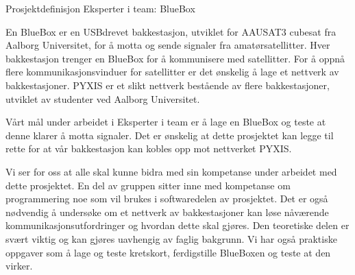 Prosjektdefinisjon Eksperter i team: BlueBox

En BlueBox er en USBdrevet bakkestasjon, utviklet for AAUSAT3 cubesat fra Aalborg Universitet, for å motta og sende signaler fra amatørsatellitter. Hver bakkestasjon trenger en BlueBox for å kommunisere med satellitter.  For å oppnå flere kommunikasjonsvinduer for satellitter er det ønskelig å lage et nettverk av bakkestasjoner. PYXIS er et slikt nettverk bestående av flere bakkestasjoner, utviklet av studenter ved Aalborg Universitet.
  
Vårt mål under arbeidet i Eksperter i team er å lage en BlueBox og teste at denne klarer å motta signaler. Det er ønskelig at dette prosjektet kan legge til rette for at vår bakkestasjon kan kobles opp mot nettverket PYXIS. 

Vi ser for oss at alle skal kunne bidra med sin kompetanse under arbeidet med dette prosjektet.  En del av gruppen sitter inne med kompetanse om programmering noe som vil brukes i softwaredelen av prosjektet.  Det er også nødvendig å undersøke om et nettverk av bakkestasjoner kan løse nåværende kommunikasjonsutfordringer og hvordan dette skal gjøres. Den teoretiske delen er svært viktig og kan gjøres uavhengig av faglig bakgrunn. Vi har også praktiske oppgaver som å lage og teste kretskort, ferdigstille BlueBoxen og teste at den virker.